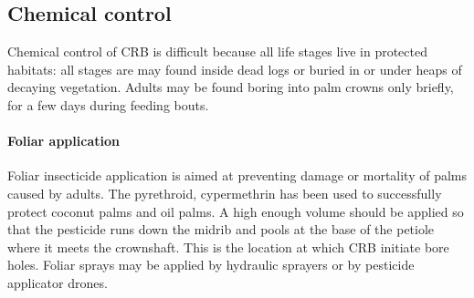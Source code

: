 \documentclass[twocolumn,letterpaper]{scrartcl}
\begin{document}


\subsection{Chemical control}

Chemical control of CRB is difficult because all life stages live in protected habitats: all stages are may found inside dead logs or buried in or under heaps of decaying vegetation. Adults may be found boring into palm crowns only briefly, for a few days during feeding bouts. 

\paragraph{Foliar application}
Foliar insecticide application is aimed at preventing damage or mortality of palms caused by adults. The pyrethroid, cypermethrin has been used to successfully protect coconut palms and oil palms. A high enough volume should be applied so that the pesticide runs down the midrib and pools at the base of the petiole where it meets the crownshaft. This is the location at which CRB initiate bore holes. Foliar sprays may be applied by hydraulic sprayers or by pesticide applicator drones.  
\end{document}
